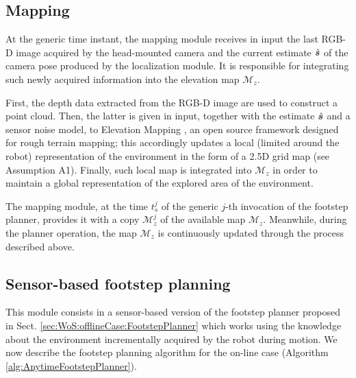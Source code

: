 \subsection{Mapping}
\label{sec:WoS:onlineCase:MappingModule}
At the generic time instant, the mapping module receives in input the last RGB-D
image acquired by the head-mounted camera and the current estimate $\hat{{\bm{s}}}$
of the camera pose produced by the localization module. 
It is responsible for integrating such newly acquired information into the
elevation map $\mathcal{M}_z$.

First, the depth data extracted from the RGB-D image are used to construct a
point cloud.
Then, the latter is given in input, together with the estimate $\hat{{\bm{s}}}$ and
a sensor noise model, to Elevation Mapping
\cite{Fankhauser2018ProbabilisticTerrainMapping}, an open source framework
designed for rough terrain mapping; this accordingly updates a local
(limited around the robot)
representation of the environment in the form of a 2.5D grid map (see
Assumption A1). Finally, such local map is integrated into $\mathcal{M}_z$ in
order to maintain a global representation of the explored area of the environment.

The mapping module, at the time $t_s^j$ of the generic $j$-th invocation of
the footstep planner, provides it with a copy $\mathcal{M}_z^j$ of the available
map $\mathcal{M}_z$.
Meanwhile, during the planner operation, the map $\mathcal{M}_z$ is continuously
updated through the process described above.

\subsection{Sensor-based footstep planning}
\label{sec:WoS:onlineCase:FootstepPlanner}
This module consists in a sensor-based version of the footstep planner proposed
in Sect. \ref{sec:WoS:offlineCase:FootstepPlanner} which works using the
knowledge about the environment incrementally acquired by the robot during motion. 
We now describe the footstep planning algorithm for the on-line case (Algorithm
\ref{alg:AnytimeFootstepPlanner}).

